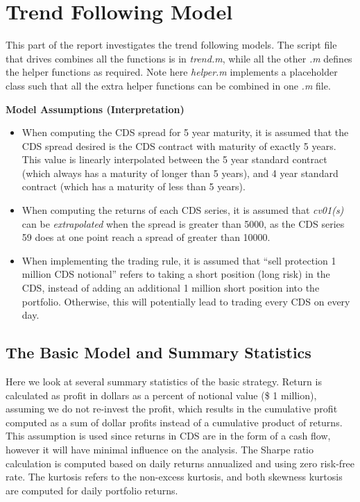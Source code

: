 \documentclass[11pt]{article}
\theoremstyle{definition}
\begin{document}
\section{Trend Following Model}

This part of the report investigates the trend following models.
The script file that drives combines all the functions is in
\emph{trend.m}, while all the other \emph{.m} defines 
the helper functions as required.
Note here \emph{helper.m} implements a placeholder class
such that all the extra helper functions can be 
combined in one \emph{.m} file.

\vspace{5mm}
\noindent
\textbf{Model Assumptions (Interpretation)}

\begin{itemize}
  \item When computing the CDS spread for 5 year maturity,
    it is assumed that the CDS spread desired is 
    the CDS contract with maturity of exactly 5 years.
    This value is linearly interpolated between
    the 5 year standard contract (which always has a maturity 
    of longer than 5 years), and 4 year standard contract 
    (which has a maturity of less than 5 years).
  \item When computing the returns of each CDS series,
    it is assumed that \emph{cv01(s)} can be \emph{extrapolated} 
    when the spread is greater than 5000,
    as the CDS series 59 does at one point reach a 
    spread of greater than 10000.
  \item When implementing the trading rule,
    it is assumed that ``sell protection 1 million CDS notional'' 
    refers to taking a short position (long risk) in the CDS, 
    instead of adding an additional 1 million short position 
    into the portfolio. 
    Otherwise, this will potentially lead to 
    trading every CDS on every day.
\end{itemize}

\subsection{The Basic Model and Summary Statistics}

Here we look at several summary statistics
of the basic strategy.
Return is calculated as profit in dollars as a percent of 
notional value (\$ 1 million), 
assuming we do not re-invest the profit,
which results in the cumulative profit 
computed as a sum of dollar profits 
instead of a cumulative product of returns.
This assumption is used since returns in CDS 
are in the form of a cash flow,
however it will have minimal influence on the analysis.
The Sharpe ratio calculation is computed based on
daily returns annualized and using zero risk-free rate.
The kurtosis refers to the non-excess kurtosis,
and both skewness kurtosis are computed for daily 
portfolio returns.
\end{document}
